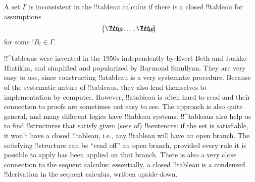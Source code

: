 \documentclass[../../../include/open-logic-section]{subfiles}
\begin{document}
A set $\Gamma$ is inconsistent in the !!{tableau} calculus if there is
a closed !!{tableau} for assumptions
\[
\{\sFmla{\True}{!B_1}, \dots, \sFmla{\True}{!B_n}\} 
\]
for some $!B_i \in \Gamma$.

!!^{tableau}s were invented in the 1950s independently by Evert
Beth and Jaakko Hintikka, and simplified and popularized by Raymond
Smullyan. They are very easy to use, since constructing !!a{tableau} is a
very systematic procedure. Because of the systematic nature of
!!{tableau}s, they also lend themselves to implementation by
computer. However, !!a{tableau} is often hard to read and their
connection to proofs are sometimes not easy to see. The approach is
also quite general, and many different logics have !!{tableau}
systems. !!^{tableau}s also help us to find !!{structure}s that
satisfy given (sets of) !!{sentence}s: if the set is satisfiable, it
won't have a closed !!{tableau}, i.e., any !!{tableau} will have an
open branch. The satisfying !!{structure} can be ``read off'' an open
branch, provided every rule it is possible to apply has been applied
on that branch.  There is also a very close connection to the sequent
calculus: essentially, a closed !!{tableau} is a condensed
!!{derivation} in the sequent calculus, written upside-down.
\end{document}
